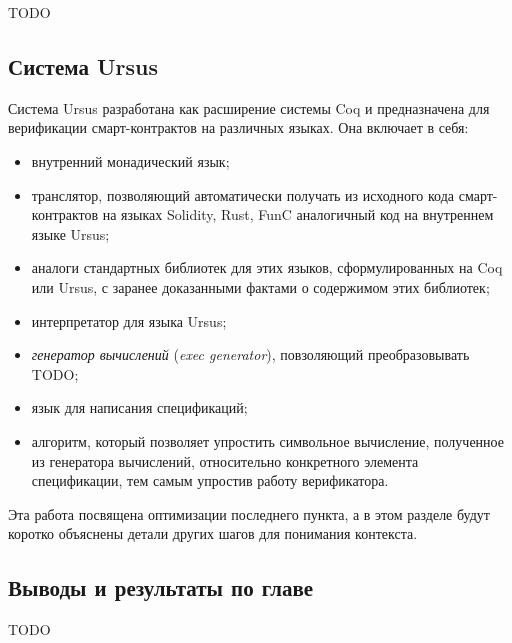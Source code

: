 \documentclass[../diploma.tex]{subfiles}
\begin{document}
TODO

\subsection{Система Ursus}

Система Ursus разработана как расширение системы Coq и предназначена для верификации смарт-контрактов на различных языках. Она включает в себя:
\begin{itemize}
    \item внутренний монадический язык;
    \item транслятор, позволяющий автоматически получать из исходного кода смарт-контрактов на языках Solidity, Rust, FunC аналогичный код на внутреннем языке Ursus;
    \item аналоги стандартных библиотек для этих языков, сформулированных на Coq или Ursus, с заранее доказанными фактами о содержимом этих библиотек;
    \item интерпретатор для языка Ursus;
    \item \textit{генератор вычислений} (\textit{exec generator}), повзоляющий преобразовывать TODO;
    \item язык для написания спецификаций;
    \item алгоритм, который позволяет упростить символьное вычисление, полученное из генератора вычислений, относительно конкретного элемента спецификации, тем самым упростив работу верификатора.
\end{itemize}

Эта работа посвящена оптимизации последнего пункта, а в этом разделе будут коротко объяснены детали других шагов для понимания контекста.

\subsection{Выводы и результаты по главе}

TODO
\end{document}
